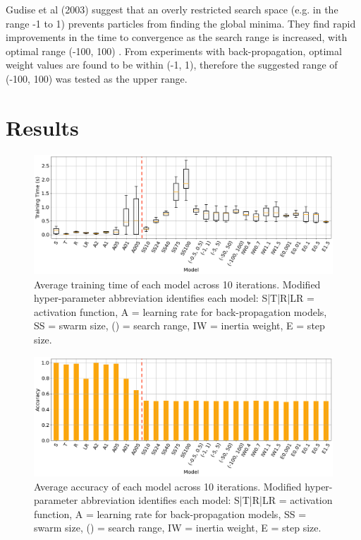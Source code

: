 \documentclass[12pt]{article}
\begin{document}
Gudise et al (2003) suggest that an overly restricted search space (e.g. in the range -1 to 1) prevents particles from finding the global minima. They find rapid improvements in the time to convergence as the search range is increased, with optimal range (-100, 100) \cite{Gudise}. From experiments with back-propagation, optimal weight values are found to be within (-1, 1), therefore the suggested range of (-100, 100) was tested as the upper range.

\vspace{-1.5em}
\section{Results}
\vspace{-1.5em}


\begin{figure}[H]
  \centering
  \includegraphics[width=1\textwidth]{figs/combo_ttime.png}
  \vspace{-1.5em}
  \caption{
    Average training time of each model across 10 iterations.
    Modified hyper-parameter abbreviation identifies each model:
    S|T|R|LR = activation function, A = learning rate for back-propagation models,
    SS = swarm size, () = search range, IW = inertia weight, E = step size.
  }
  \label{fig:ttime}
\end{figure}

\begin{figure}[H]
  \centering
  \includegraphics[width=1\textwidth]{figs/combo_acc.png}
  \vspace{-1.5em}
  \caption{
    Average accuracy of each model across 10 iterations.
    Modified hyper-parameter abbreviation identifies each model:
    S|T|R|LR = activation function, A = learning rate for back-propagation models,
    SS = swarm size, () = search range, IW = inertia weight, E = step size.
  }
  \label{fig:accuracy}
\end{figure}
\end{document}
